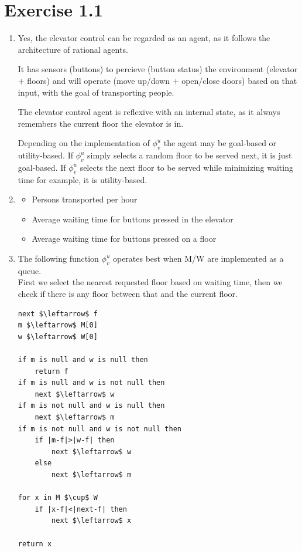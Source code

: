 \documentclass{article}
\begin{document}
\section*{Exercise 1.1}
\begin{enumerate}[label=(\alph*)]
	\item	Yes, the elevator control can be regarded as an agent, as it follows the architecture of rational agents.

			It has sensors (buttons) to percieve (button status) the environment (elevator + floors) and will operate (move up/down + open/close doors) based on that input, with the goal of transporting people.

			The elevator control agent is reflexive with an internal state, as it always remembers the current floor the elevator is in.

			Depending on the implementation of $\phi_v^u$ the agent may be goal-based or utility-based. If $\phi_v^u$ simply selects a random floor to be served next, it is just goal-based. If $\phi_v^u$ selects the next floor to be served while minimizing waiting time for example, it is utility-based.
	\item	\begin{itemize}
				\item	Persons transported per hour
				\item	Average waiting time for buttons pressed in the elevator
				\item	Average waiting time for buttons pressed on a floor
			\end{itemize}
	\item	The following function $\phi_v^u$ operates best when M/W are implemented as a queue. \\
			First we select the nearest requested floor based on waiting time, then we check if there is any floor between that and the current floor.
\begin{lstlisting}
next $\leftarrow$ f
m $\leftarrow$ M[0]
w $\leftarrow$ W[0]

if m is null and w is null then
	return f
if m is null and w is not null then
	next $\leftarrow$ w
if m is not null and w is null then
	next $\leftarrow$ m
if m is not null and w is not null then
	if |m-f|>|w-f| then
		next $\leftarrow$ w
	else
		next $\leftarrow$ m

for x in M $\cup$ W
	if |x-f|<|next-f| then
		next $\leftarrow$ x

return x
\end{lstlisting}
\end{enumerate}
\end{document}
